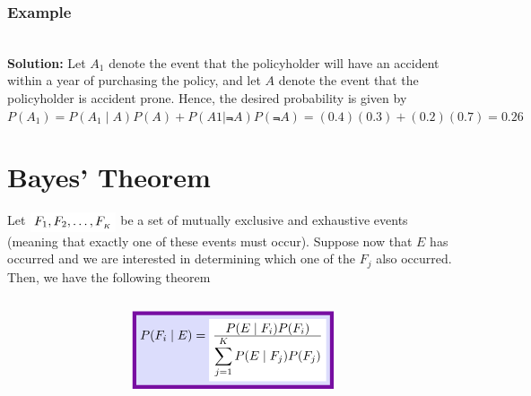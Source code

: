 \documentclass[compress]{beamer}
\begin{document}
\begin{frame}\frametitle{Example}
\vspace{-.1in}
\\
\pause
\vspace{.6in}
{\tiny {\bf Solution:}  
 Let $A_1$ denote the event that the policyholder will have an accident within a year of purchasing
the policy, and let $A$ denote the event that the policyholder is accident prone. Hence, the desired probability is given by
$P(A_1) = P(A_1\mid A)P(A) + P(A1\mid \Not{A})P(\Not{A}) = (0.4)(0.3)+(0.2)(0.7	)=0.26$
}
\end{frame}










\section{Bayes' Theorem}


\begin{frame}

\begin{theorem}
Let $\HLTW{F_1, F_2, \ldots,  F_{_K}}$ be a set of mutually exclusive and exhaustive events (meaning that exactly one of these events must occur).  Suppose now that $E$ has occurred and we are interested in determining which one of the $F_j$ also occurred. Then, we have the following theorem\\
\ \vspace{-.2in}
$$\DBX{ \displaystyle P(F_i \mid E)=\HLTW{ \frac{ \displaystyle P(E\mid F_i) P(F_i )}{\displaystyle \sum_{j=1}^{K}P(E\mid F_j) P(F_j) }}}$$
\end{theorem}



\end{frame}
\end{document}
